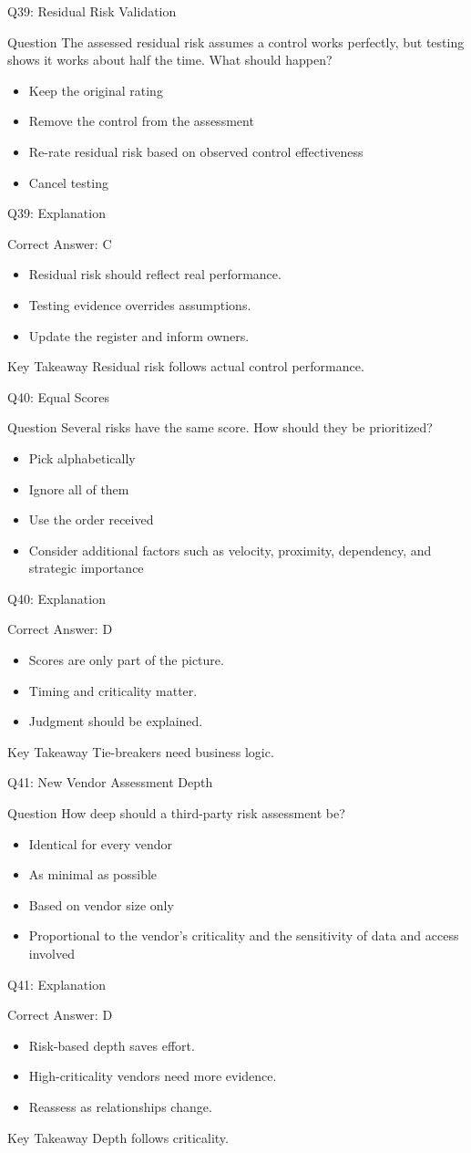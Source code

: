 \documentclass[aspectratio=169]{beamer}
\newcommand{\hq}[7]{%
	\begin{frame}{Q#1: #2}
		\begin{block}{Question}
			#3
		\end{block}
		\begin{itemize}
			#4
		\end{itemize}
	\end{frame}
	\begin{frame}{Q#1: Explanation}
		\begin{block}{Correct Answer: #5}
			\begin{itemize}
				#6
			\end{itemize}
		\end{block}
		\begin{alertblock}{Key Takeaway}
			#7
		\end{alertblock}
	\end{frame}
}
\begin{document}
	\hq{39}{Residual Risk Validation}
	{The assessed residual risk assumes a control works perfectly, but testing shows it works about half the time. What should happen?}
	{\item[\textbf{(A)}] Keep the original rating
		\item[\textbf{(B)}] Remove the control from the assessment
		\item[\textbf{(C)}] Re-rate residual risk based on observed control effectiveness
		\item[\textbf{(D)}] Cancel testing}
	{C}
	{\item Residual risk should reflect real performance.
		\item Testing evidence overrides assumptions.
		\item Update the register and inform owners.}
	{Residual risk follows actual control performance.}
	
	\hq{40}{Equal Scores}
	{Several risks have the same score. How should they be prioritized?}
	{\item[\textbf{(A)}] Pick alphabetically
		\item[\textbf{(B)}] Ignore all of them
		\item[\textbf{(C)}] Use the order received
		\item[\textbf{(D)}] Consider additional factors such as velocity, proximity, dependency, and strategic importance}
	{D}
	{\item Scores are only part of the picture.
		\item Timing and criticality matter.
		\item Judgment should be explained.}
	{Tie-breakers need business logic.}
	
	\hq{41}{New Vendor Assessment Depth}
	{How deep should a third-party risk assessment be?}
	{\item[\textbf{(A)}] Identical for every vendor
		\item[\textbf{(B)}] As minimal as possible
		\item[\textbf{(C)}] Based on vendor size only
		\item[\textbf{(D)}] Proportional to the vendor's criticality and the sensitivity of data and access involved}
	{D}
	{\item Risk-based depth saves effort.
		\item High-criticality vendors need more evidence.
		\item Reassess as relationships change.}
	{Depth follows criticality.}
	
\end{document}
